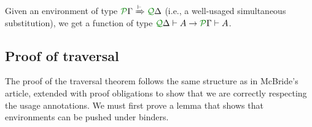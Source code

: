 \documentclass[submission,copyright,creativecommons]{eptcs}
\begin{document}
\begin{corollary}\label{cor:sub}
  Given an environment of type
  $\ctx{\Gamma}{P} \subst{\vdash} \ctx{\Delta}{Q}$ (i.e., a
  well-usaged simultaneous substitution), we get a function of type
  $\ctx{\Delta}{Q} \vdash A \to \ctx{\Gamma}{P} \vdash A$.
\end{corollary}

\subsection{Proof of traversal}
\label{sec:proof-of-traversal}

The proof of the traversal theorem follows the same structure as in
McBride's article, extended with proof obligations to show that we are
correctly respecting the usage annotations. We must first prove a
lemma that shows that environments can be pushed under binders.
\end{document}
